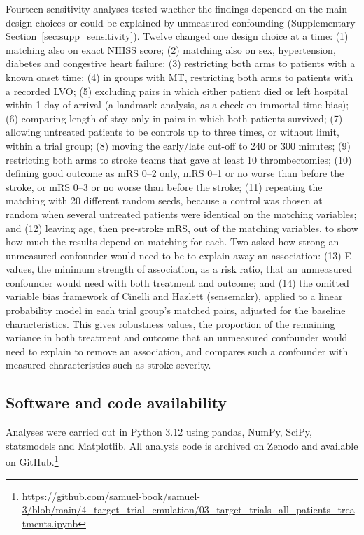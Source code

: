 Fourteen sensitivity analyses tested whether the findings depended on the main design choices or could be explained by unmeasured confounding (Supplementary Section~\ref{sec:supp_sensitivity}). Twelve changed one design choice at a time: (1) matching also on exact NIHSS score; (2) matching also on sex, hypertension, diabetes and congestive heart failure; (3) restricting both arms to patients with a known onset time; (4) in groups with MT, restricting both arms to patients with a recorded LVO; (5) excluding pairs in which either patient died or left hospital within 1 day of arrival (a landmark analysis, as a check on immortal time bias); (6) comparing length of stay only in pairs in which both patients survived; (7) allowing untreated patients to be controls up to three times, or without limit, within a trial group; (8) moving the early/late cut-off to 240 or 300 minutes; (9) restricting both arms to stroke teams that gave at least 10 thrombectomies; (10) defining good outcome as mRS 0--2 only, mRS 0--1 or no worse than before the stroke, or mRS 0--3 or no worse than before the stroke; (11) repeating the matching with 20 different random seeds, because a control was chosen at random when several untreated patients were identical on the matching variables; and (12) leaving age, then pre-stroke mRS, out of the matching variables, to show how much the results depend on matching for each. Two asked how strong an unmeasured confounder would need to be to explain away an association: (13) E-values, the minimum strength of association, as a risk ratio, that an unmeasured confounder would need with both treatment and outcome\cite{vanderweele_sensitivity_2017, agresti_categorical_2013}; and (14) the omitted variable bias framework of Cinelli and Hazlett (sensemakr)\cite{cinelli_making_2020}, applied to a linear probability model in each trial group's matched pairs, adjusted for the baseline characteristics. This gives robustness values, the proportion of the remaining variance in both treatment and outcome that an unmeasured confounder would need to explain to remove an association, and compares such a confounder with measured characteristics such as stroke severity.

\subsection{Software and code availability}

Analyses were carried out in Python 3.12 using pandas\cite{mckinney_data_2010}, NumPy\cite{harris_array_2020}, SciPy\cite{virtanen_scipy_2020}, statsmodels\cite{seabold_statsmodels_2010} and Matplotlib\cite{hunter_matplotlib_2007}. All analysis code is archived on Zenodo\cite{allen_samuel3_2026} and available on GitHub.\footnote{\url{https://github.com/samuel-book/samuel-3/blob/main/4_target_trial_emulation/03_target_trials_all_patients_treatments.ipynb}}
